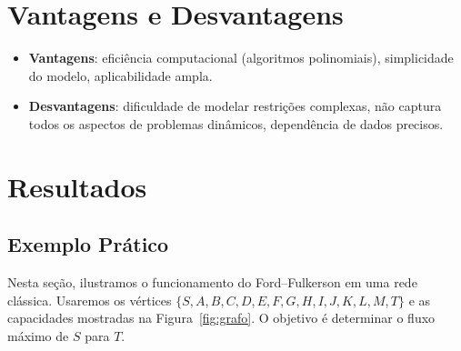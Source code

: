 \documentclass[12pt]{article}
\begin{document}
\section{Vantagens e Desvantagens} \label{sec:vantagens}

\begin{itemize}
    \item \textbf{Vantagens}: eficiência computacional (algoritmos polinomiais), simplicidade do modelo, aplicabilidade ampla.
    \item \textbf{Desvantagens}: dificuldade de modelar restrições complexas, não captura todos os aspectos de problemas dinâmicos, dependência de dados precisos.
\end{itemize}

\section{Resultados}
\subsection{Exemplo Prático} \label{sec:implementacao} 

Nesta seção, ilustramos o funcionamento do Ford–Fulkerson em uma rede clássica. Usaremos os vértices $\{S, A, B, C, D, E, F, G, H, I, J, K, L, M, T\}$ e as capacidades mostradas na Figura~\ref{fig:grafo}. O objetivo é determinar o fluxo máximo de $S$ para $T$.\vskip0.5cm
\end{document}
